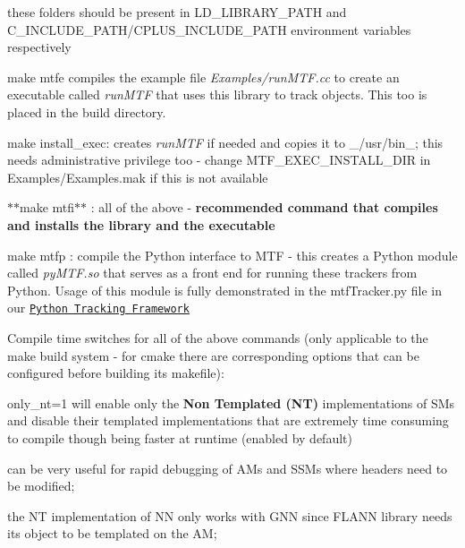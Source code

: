 \begin{DoxyItemize}
\begin{DoxyItemize}
\begin{DoxyItemize}
\begin{DoxyItemize}
\item these folders should be present in L\-D\-\_\-\-L\-I\-B\-R\-A\-R\-Y\-\_\-\-P\-A\-T\-H and C\-\_\-\-I\-N\-C\-L\-U\-D\-E\-\_\-\-P\-A\-T\-H/\-C\-P\-L\-U\-S\-\_\-\-I\-N\-C\-L\-U\-D\-E\-\_\-\-P\-A\-T\-H environment variables respectively
\end{DoxyItemize}
\end{DoxyItemize}
\item {\ttfamily make mtfe} compiles the example file {\itshape Examples/run\-M\-T\-F.\-cc} to create an executable called {\itshape run\-M\-T\-F} that uses this library to track objects. This too is placed in the build directory.
\item {\ttfamily make install\-\_\-exec}\-: creates {\itshape run\-M\-T\-F} if needed and copies it to \-\_\-/usr/bin\-\_\-; this needs administrative privilege too -\/ change {\ttfamily M\-T\-F\-\_\-\-E\-X\-E\-C\-\_\-\-I\-N\-S\-T\-A\-L\-L\-\_\-\-D\-I\-R} in Examples/\-Examples.\-mak if this is not available
\item $\ast$$\ast${\ttfamily make mtfi}$\ast$$\ast$ \-: all of the above -\/ {\bfseries recommended command that compiles and installs the library and the executable}
\item {\ttfamily make mtfp} \-: compile the Python interface to M\-T\-F -\/ this creates a Python module called {\itshape py\-M\-T\-F.\-so} that serves as a front end for running these trackers from Python. Usage of this module is fully demonstrated in the {\ttfamily mtf\-Tracker.\-py} file in our \href{https://bitbucket.org/abhineet123/ptf}{\tt Python Tracking Framework}
\item Compile time switches for all of the above commands (only applicable to the make build system -\/ for cmake there are corresponding options that can be configured before building its makefile)\-:
\begin{DoxyItemize}
\item {\ttfamily only\-\_\-nt=1} will enable only the {\bfseries Non Templated (N\-T)} implementations of S\-Ms and disable their templated implementations that are extremely time consuming to compile though being faster at runtime (enabled by default)
\begin{DoxyItemize}
\item can be very useful for rapid debugging of A\-Ms and S\-S\-Ms where headers need to be modified;
\item the N\-T implementation of N\-N only works with G\-N\-N since F\-L\-A\-N\-N library needs its object to be templated on the A\-M;

\end{DoxyItemize}
\end{DoxyItemize}
\end{DoxyItemize}
\end{DoxyItemize}
